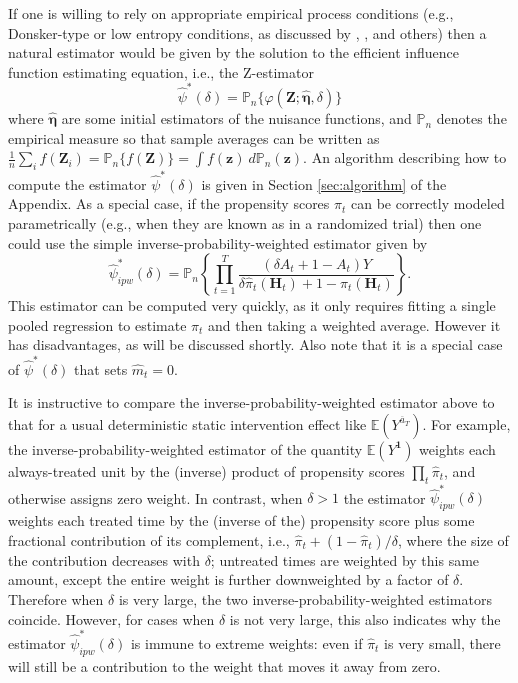 \documentclass[12pt]{article}
\newcommand{\Pn}{\mathbb{P}_n}
\newcommand{\E}{\mathbb{E}}
\newcommand{\bZ}{\mathbf{Z}}
\newcommand{\bz}{\mathbf{z}}
\newcommand{\bH}{\mathbf{H}}
\theoremstyle{remark}
\begin{document}
If one is willing to rely on appropriate empirical process conditions (e.g., Donsker-type or low entropy conditions, as discussed by \textcite{van1996weak}, \textcite{van2000asymptotic}, and others) then a natural estimator would be given by the solution to the efficient influence function estimating equation, i.e., the Z-estimator
$$ \hat\psi^*(\delta) = \Pn\{ \varphi(\bZ;\hat{\boldsymbol\eta}, \delta) \} $$
where $\hat{\boldsymbol\eta}$ are some initial estimators of the nuisance functions, and $\Pn$ denotes the empirical measure so that sample averages can be written as $\frac{1}{n} \sum_i f(\bZ_i) = \Pn\{f(\bZ)\} =  \int f(\bz)  \ d\Pn(\bz)$. An algorithm describing how to compute the estimator $\hat\psi^*(\delta)$ is given in Section \ref{sec:algorithm} of the Appendix. As a special case, if the propensity scores $\pi_t$ can be correctly modeled parametrically (e.g., when they are known as in a randomized trial) then one could use the simple inverse-probability-weighted estimator given by
$$ \hat\psi_{ipw}^*(\delta) = \Pn\left\{ \prod_{t=1}^T \frac{( \delta A_t + 1-A_t) Y}{\delta \hat\pi_t(\bH_t) + 1-\hat\pi_t(\bH_t)} \right\} . $$
This estimator can be computed very quickly, as it only requires fitting a single pooled regression to estimate $\pi_t$ and then taking a weighted average. However it has disadvantages, as will be discussed shortly.  Also note that it is a special case of $\hat\psi^*(\delta)$ that sets $\hat{m}_t=0$. 

It is instructive to compare the inverse-probability-weighted estimator above to that for a usual deterministic static intervention effect like $\E(Y^{\overline{a}_T})$. For example, the inverse-probability-weighted estimator of the quantity $\E(Y^\mathbf{1})$ weights each always-treated unit by the (inverse) product of propensity scores $\prod_t \hat\pi_t$, and otherwise assigns zero weight. In contrast, when $\delta>1$ the estimator $\hat\psi_{ipw}^*(\delta)$ weights each treated time by the (inverse of the) propensity score plus some fractional contribution of its complement, i.e., $\hat\pi_t + (1-\hat\pi_t)/\delta$, where the size of the contribution decreases with $\delta$; untreated times are weighted by this same amount, except the entire weight is further downweighted by a factor of $\delta$. Therefore when $\delta$ is very large, the two inverse-probability-weighted estimators coincide. However, for cases when $\delta$ is not very large, this also indicates why the estimator $\hat\psi_{ipw}^*(\delta)$ is immune to extreme weights: even if $\hat\pi_t$ is very small, there will still be a contribution to the weight that moves it away from zero.
\end{document}
